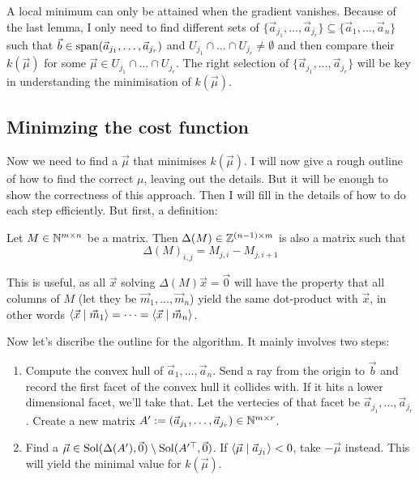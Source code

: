 A local minimum can only be attained when the gradient vanishes. Because of the last lemma, I only need to find different sets of $\{\vec a_{j_1}, \dots, \vec a_{j_r}\} \subseteq \{\vec a_1, \dots, \vec a_n\}$ such that $\vec b \in \operatorname{span}(\vec a_{j_1}, \dots, \vec a_{j_r})$ and $U_{j_1} \cap \dots \cap U_{j_r} \neq \emptyset$ and then compare their $k(\vec\mu)$ for some $\vec\mu \in U_{j_1} \cap \dots \cap U_{j_r}$. The right selection of $\{\vec a_{j_1}, \dots, \vec a_{j_r}\}$ will be key in understanding the minimisation of $k(\vec\mu)$. 

\subsection{Minimzing the cost function}
Now we need to find a $\vec\mu$ that minimises $k(\vec\mu)$. I will now give a rough outline of how to find the correct $\mu$, leaving out the details. But it will be enough to show the correctness of this approach. Then I will fill in the details of how to do each step efficiently. But first, a definition:
\begin{definition}
    Let $M \in \mathbb{N}^{m\times n}$ be a matrix. Then $\Delta(M) \in \mathbb{Z}^{(n-1)\times m}$ is also a matrix such that 
    $$\Delta(M)_{i,j} = M_{j,i} - M_{j,i+1}$$
\end{definition}
\begin{observation}
    \label{obs:delta_meaning}
    This is useful, as all $\vec x$ solving $\Delta(M)\vec x = \vec 0$ will have the property that all columns of $M$ (let they be $\vec m_1, \dots, \vec m_n$) yield the same dot-product with $\vec x$, in other words $\langle \vec x \mid \vec m_1 \rangle = \dots = \langle \vec x \mid \vec m_n \rangle$.
\end{observation}

Now let's discribe the outline for the algorithm. It mainly involves two steps:
\begin{algorithm}
    \label{algo}
    \begin{enumerate}
        \item Compute the convex hull of $\vec a_1, \dots, \vec a_n$. Send a ray from the origin to $\vec b$ and record the first facet of the convex hull it collides with. If it hits a lower dimensional facet, we'll take that. Let the vertecies of that facet be $\vec a_{j_1}, \dots, \vec a_{j_r}$. Create a new matrix $A' := (\vec a_{j_1}, \dots, \vec a_{j_r}) \in \mathbb{N}^{m \times r}$.
        \item Find a $\vec\mu \in \operatorname{Sol}(\Delta(A'), \vec0) \setminus \operatorname{Sol}(A'^\top, \vec0)$. If $\langle \vec\mu \mid \vec a_{j_1} \rangle<0$, take $-\vec\mu$ instead. This will yield the minimal value for $k(\vec\mu)$.
    \end{enumerate}
\end{algorithm}

